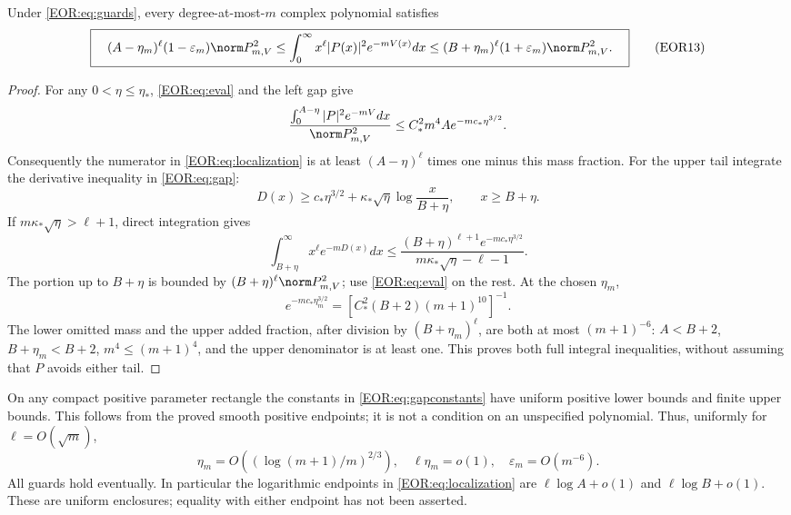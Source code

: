 \documentclass[11pt,a4paper]{article}
\begin{document}
\begin{QOTtheorem}
Under \eqref{EOR:eq:guards}, every degree-at-most-$m$ complex polynomial satisfies
\begin{equation}
 \boxed{\quad
 (A-\eta_m)^\ell(1-\varepsilon_m)\norm P_{m,V}^2
 \le\int_0^\infty x^\ell|P(x)|^2e^{-mV(x)}dx
 \le(B+\eta_m)^\ell(1+\varepsilon_m)\norm P_{m,V}^2.
 \quad}\label{EOR:eq:localization}
\tag{EOR13}
\end{equation}
\end{QOTtheorem}
\begin{proof}
For any $0<\eta\le\eta_*$, \eqref{EOR:eq:eval} and the left gap give
\[
 \frac{\int_0^{A-\eta}|P|^2e^{-mV}dx}{\norm P_{m,V}^2}
 \le C_*^2m^4 A e^{-mc_*\eta^{3/2}}.
\]
Consequently the numerator in \eqref{EOR:eq:localization} is at least
$(A-\eta)^\ell$ times one minus this mass fraction.
For the upper tail integrate the derivative inequality in \eqref{EOR:eq:gap}:
\[
 D(x)\ge c_*\eta^{3/2}+\kappa_*\sqrt\eta\log\frac{x}{B+\eta},
 \qquad x\ge B+\eta.
\]
If $m\kappa_*\sqrt\eta>\ell+1$, direct integration gives
\[
 \int_{B+\eta}^\infty x^\ell e^{-mD(x)}dx
 \le\frac{(B+\eta)^{\ell+1}e^{-mc_*\eta^{3/2}}}
                {m\kappa_*\sqrt\eta-\ell-1}.
\]
The portion up to $B+\eta$ is bounded by $(B+\eta)^\ell\norm P_{m,V}^2$;
use \eqref{EOR:eq:eval} on the rest. At the chosen $\eta_m$,
\[
 e^{-mc_*\eta_m^{3/2}}
   =[C_*^2(B+2)(m+1)^{10}]^{-1}.
\]
The lower omitted mass and the upper added fraction, after division by
$(B+\eta_m)^\ell$, are both at most $(m+1)^{-6}$:
$A<B+2$, $B+\eta_m<B+2$, $m^4\le(m+1)^4$, and the upper denominator is at
least one. This proves both full integral inequalities, without assuming that
$P$ avoids either tail.
\end{proof}

On any compact positive parameter rectangle the constants in
\eqref{EOR:eq:gapconstants} have uniform positive lower bounds and finite upper bounds.
This follows from the proved smooth positive endpoints; it is not a condition
on an unspecified polynomial. Thus, uniformly for $\ell=O(\sqrt m)$,
\begin{equation}
 \eta_m=O((\log(m+1)/m)^{2/3}),\quad
 \ell\eta_m=o(1),\quad \varepsilon_m=O(m^{-6}).
 \label{EOR:eq:locasym}
\tag{EOR14}
\end{equation}
All guards hold eventually. In particular the logarithmic endpoints in
\eqref{EOR:eq:localization} are $\ell\log A+o(1)$ and $\ell\log B+o(1)$.
These are uniform enclosures; equality with either endpoint has not been asserted.
\end{document}
